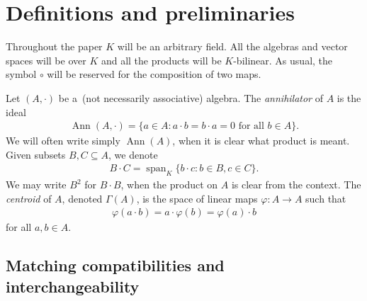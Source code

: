 \documentclass{jonasart}
\newcommand{\G}{\Gamma}
\newcommand{\sst}{\subseteq}
\newcommand{\vf}{\varphi}
\DeclareMathOperator{\Ann}{Ann}
\DeclareMathOperator{\spn}{span}
\begin{document}
	\section{Definitions and preliminaries}\label{sec-prelim}

	Throughout the paper $K$ will be an arbitrary field. All the algebras and vector spaces will be over $K$ and all the products will be $K$-bilinear. As usual, the symbol $\circ$ will be reserved for the composition of two maps.

	Let $(A,\cdot)$ be a~(not necessarily associative) algebra. The \textit{annihilator} of $A$ is the ideal
	\begin{align*}
		\Ann(A,\cdot)=\{a\in A: a\cdot b=b\cdot a=0\text{ for all }b\in A\}.
	\end{align*}
	We will often write simply $\Ann(A)$, when it is clear what product is meant. Given subsets $B,C\sst A$, we denote
	\begin{align*}
		B\cdot C=\spn_K\{b\cdot c: b\in B,c\in C\}.
	\end{align*}
	We may write $B^2$ for $B\cdot B$, when the product on $A$ is clear from the context. The \textit{centroid} of $A$, denoted $\G(A)$, is the space of linear maps $\vf:A\to A$ such that
	\begin{align}\label{vf(xy)=vf(x).y=x.vf(y)}
		\vf(a\cdot b)=a\cdot\vf(b)=\vf(a)\cdot b
	\end{align}
	for all $a,b\in A$.

	\subsection{Matching compatibilities and interchangeability}
\end{document}
